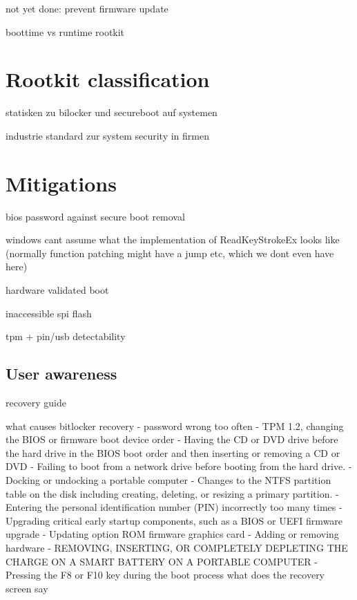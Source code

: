 not yet done: prevent firmware update


boottime vs runtime rootkit

\section{Rootkit classification}

statisken zu bilocker und secureboot auf systemen

industrie standard zur system security in firmen

\section{Mitigations}

bios password against secure boot removal

windows cant assume what the implementation of ReadKeyStrokeEx looks like (normally function patching might have a jump etc, which we dont even have here)

hardware validated boot

inaccessible spi flash

tpm + pin/usb detectability

\subsection{User awareness}



recovery guide

what causes bitlocker recovery
- password wrong too often
- TPM 1.2, changing the BIOS or firmware boot device order
- Having the CD or DVD drive before the hard drive in the BIOS boot order and then inserting or removing a CD or DVD
- Failing to boot from a network drive before booting from the hard drive.
- Docking or undocking a portable computer
- Changes to the NTFS partition table on the disk including creating, deleting, or resizing a primary partition.
- Entering the personal identification number (PIN) incorrectly too many times
- Upgrading critical early startup components, such as a BIOS or UEFI firmware upgrade
- Updating option ROM firmware graphics card
- Adding or removing hardware
- REMOVING, INSERTING, OR COMPLETELY DEPLETING THE CHARGE ON A SMART BATTERY ON A PORTABLE COMPUTER
- Pressing the F8 or F10 key during the boot process
what does the recovery screen say

